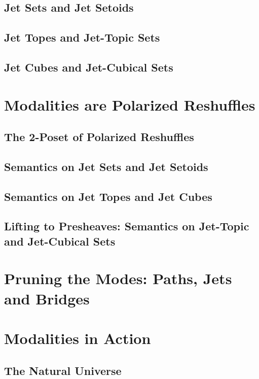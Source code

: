 \documentclass[twoLevelNum]{higherStructures} %
\begin{document}
\subsection{Jet Sets and Jet Setoids}

\subsection{Jet Topes and Jet-Topic Sets}

\subsection{Jet Cubes and Jet-Cubical Sets}

\section{Modalities are Polarized Reshuffles}

\subsection{The 2-Poset of Polarized Reshuffles}

\subsection{Semantics on Jet Sets and Jet Setoids}

\subsection{Semantics on Jet Topes and Jet Cubes}

\subsection{Lifting to Presheaves: Semantics on Jet-Topic and Jet-Cubical Sets}

\section{Pruning the Modes: Paths, Jets and Bridges}

\section{Modalities in Action}

\subsection{The Natural Universe}
\end{document}
